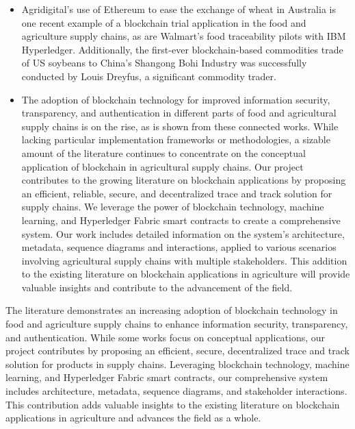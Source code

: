 \begin{itemize}
    \item Agridigital's use of Ethereum to ease the exchange of 
    wheat in Australia is one recent example of a blockchain 
    trial application in the food and agriculture supply 
    chains, as are Walmart's food traceability pilots with 
    IBM Hyperledger. Additionally, the first-ever 
    blockchain-based commodities trade of US soybeans to 
    China's Shangong Bohi Industry was successfully 
    conducted by Louis Dreyfus, a significant commodity 
    trader.
    
    \item The adoption of blockchain technology for improved 
    information security, transparency, and authentication in 
    different parts of food and agricultural supply chains is 
    on the rise, as is shown from these connected works. 
    While lacking particular implementation frameworks or 
    methodologies, a sizable amount of the literature 
    continues to concentrate on the conceptual application of 
    blockchain in agricultural supply chains. 
    Our project contributes to the growing literature on 
    blockchain applications by proposing an efficient, 
    reliable, secure, and decentralized trace and track solution 
    for supply chains. We leverage the power of 
    blockchain technology, machine learning, and 
    Hyperledger Fabric smart contracts to create a 
    comprehensive system. Our work includes detailed 
    information on the system's architecture, metadata, 
    sequence diagrams and interactions, applied to various 
    scenarios involving agricultural supply chains with 
    multiple stakeholders. This addition to the existing 
    literature on blockchain applications in agriculture will 
    provide valuable insights and contribute to the 
    advancement of the field.
  \end{itemize}


\noindent The literature demonstrates an increasing adoption of blockchain technology in food and agriculture supply chains to enhance information security, transparency, and authentication. While some works focus on conceptual applications, our project contributes by proposing an efficient, secure, decentralized trace and track solution for products in supply chains. Leveraging blockchain technology, machine learning, and Hyperledger Fabric smart contracts, our comprehensive system includes architecture, metadata, sequence diagrams, and stakeholder interactions. This contribution adds valuable insights to the existing literature on blockchain applications in agriculture and advances the field as a whole.